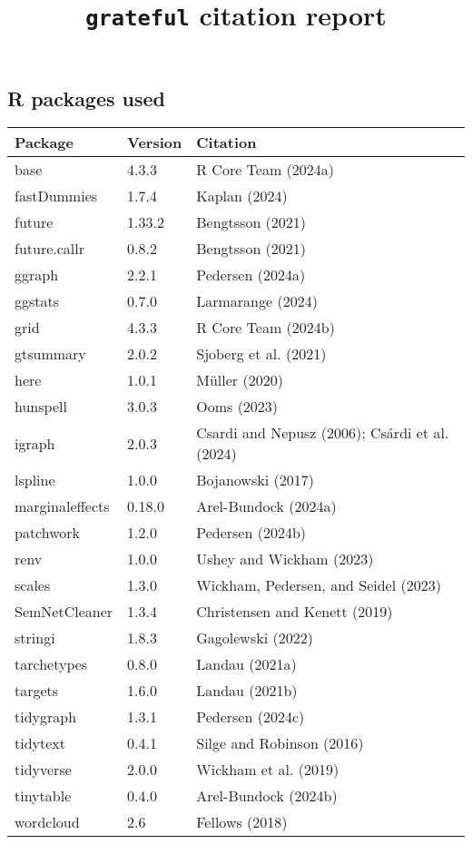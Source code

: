 \documentclass[
]{article}
\title{\texttt{grateful} citation report}
\author{}
\date{\vspace{-2.5em}}
\begin{document}
\maketitle

\hypertarget{r-packages-used}{%
\subsection{R packages used}\label{r-packages-used}}

\begin{longtable}[]{@{}lll@{}}
\toprule\noalign{}
Package & Version & Citation \\
\midrule\noalign{}
\endhead
\bottomrule\noalign{}
\endlastfoot
base & 4.3.3 & R Core Team (2024a) \\
fastDummies & 1.7.4 & Kaplan (2024) \\
future & 1.33.2 & Bengtsson (2021) \\
future.callr & 0.8.2 & Bengtsson (2021) \\
ggraph & 2.2.1 & Pedersen (2024a) \\
ggstats & 0.7.0 & Larmarange (2024) \\
grid & 4.3.3 & R Core Team (2024b) \\
gtsummary & 2.0.2 & Sjoberg et al. (2021) \\
here & 1.0.1 & Müller (2020) \\
hunspell & 3.0.3 & Ooms (2023) \\
igraph & 2.0.3 & Csardi and Nepusz (2006); Csárdi et al. (2024) \\
lspline & 1.0.0 & Bojanowski (2017) \\
marginaleffects & 0.18.0 & Arel-Bundock (2024a) \\
patchwork & 1.2.0 & Pedersen (2024b) \\
renv & 1.0.0 & Ushey and Wickham (2023) \\
scales & 1.3.0 & Wickham, Pedersen, and Seidel (2023) \\
SemNetCleaner & 1.3.4 & Christensen and Kenett (2019) \\
stringi & 1.8.3 & Gagolewski (2022) \\
tarchetypes & 0.8.0 & Landau (2021a) \\
targets & 1.6.0 & Landau (2021b) \\
tidygraph & 1.3.1 & Pedersen (2024c) \\
tidytext & 0.4.1 & Silge and Robinson (2016) \\
tidyverse & 2.0.0 & Wickham et al. (2019) \\
tinytable & 0.4.0 & Arel-Bundock (2024b) \\
wordcloud & 2.6 & Fellows (2018) \\
\end{longtable}
\end{document}
